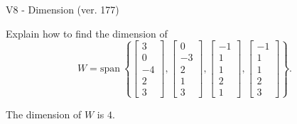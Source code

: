 \begin{exercise}
  \begin{exerciseTitle}V8 - Dimension (ver. 177)\end{exerciseTitle}
  \begin{exerciseStatement}
    Explain how to find the dimension of 
\[W=\mathrm{span}\ \left\{\left[\begin{array}{r}
3 \\
0 \\
-4 \\
2 \\
3
\end{array}\right] , \left[\begin{array}{r}
0 \\
-3 \\
2 \\
1 \\
3
\end{array}\right] , \left[\begin{array}{r}
-1 \\
1 \\
1 \\
2 \\
1
\end{array}\right] , \left[\begin{array}{r}
-1 \\
1 \\
1 \\
2 \\
3
\end{array}\right]\right\}.\]



  \end{exerciseStatement}
  \begin{exerciseAnswer}
   The dimension of \(W\) is  \(4\).
  


  \end{exerciseAnswer}
\end{exercise}